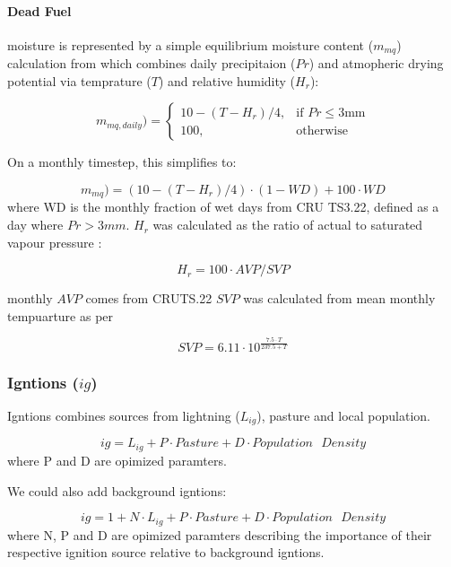 \paragraph{Dead Fuel} moisture is represented by a simple equilibrium moisture content ($m_{mq}$) calculation from \citep{viney1991review} which combines daily precipitaion ($Pr$) and atmopheric drying potential via temprature ($T$) and relative humidity ($H_r$):

\begin{equation}
     m_{mq, daily})=
        \begin{cases}
            10 - (T - H_r) / 4 ,& \text{if } Pr\leq 3 \text{mm}\\
            100,              & \text{otherwise}
        \end{cases}
\end{equation}

On a monthly timestep, this simplifies to:

\begin{equation}
     m_{mq})=
        (10 - (T - H_r) / 4) \cdot (1 - WD)
        + 100 \cdot WD
\end{equation}
where WD is the monthly fraction of wet days from CRU TS3.22, defined as a day where $Pr > 3mm$. $H_r$ was calculated as the ratio of actual to saturated vapour pressure :

\begin{equation}
    H_r = 100 \cdot AVP / SVP
\end{equation}

monthly $AVP$ comes from CRUTS.22 $SVP$ was calculated from mean monthly tempuarture as per \citet{walter2000asce}

\begin{equation}
    SVP = 6.11 \cdot 10^{\frac{7.5 \cdot T}{237.5 + T}}
\end{equation} 

\subsubsection{Igntions ($ig$)}

Igntions combines sources from lightning ($L_{ig}$), pasture and local population.

\begin{equation}
    ig = L_{ig} + P \cdot Pasture + D \cdot Population\text{ }Density
\end{equation}
where P and D are opimized paramters.

\begin{shaded}
    We could also add background igntions:

    \begin{equation}
        ig = 1 + N \cdot L_{ig} + P \cdot Pasture + D \cdot Population\text{ }Density
    \end{equation}
    where N, P and D are opimized paramters describing the importance of their respective ignition source relative to background igntions.
\end{shaded}

